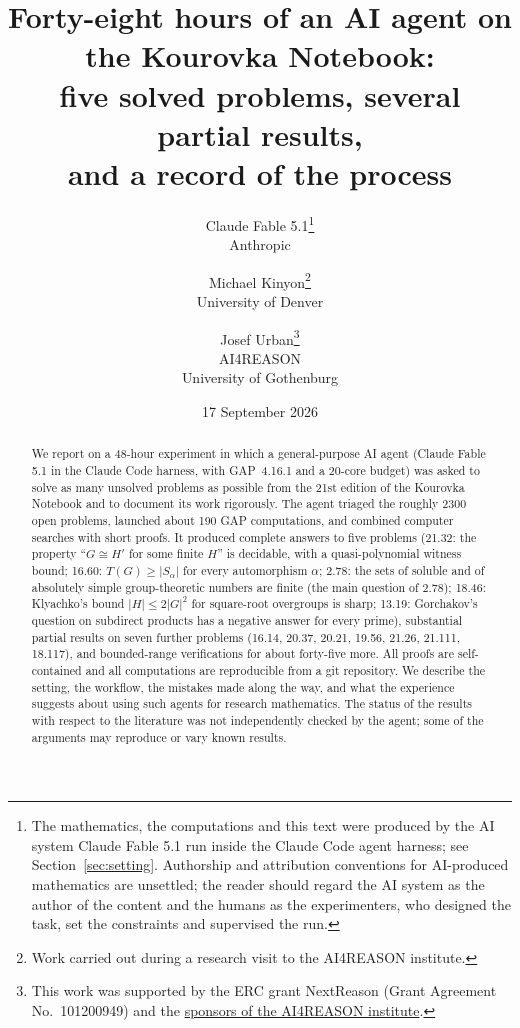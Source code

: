 \documentclass[11pt]{article}
\title{Forty-eight hours of an AI agent on the Kourovka Notebook:\\
five solved problems, several partial results,\\ and a record of the process}
\author{Claude Fable 5.1\thanks{The mathematics, the computations and this text were produced by the
AI system Claude Fable 5.1 run inside the Claude Code agent harness; see Section~\ref{sec:setting}. Authorship and
attribution conventions for AI-produced mathematics are unsettled; the reader should regard the AI system as the
author of the content and the humans as the experimenters, who designed the task, set the constraints and
supervised the run.}\\Anthropic
\and Michael Kinyon\thanks{Work carried out during a research visit to the AI4REASON institute.}\\University of Denver
\and Josef Urban\thanks{This work was supported by the ERC grant NextReason
(Grant Agreement No.\ 101200949) and the
\href{https://ai4reason.eu/sponsors.html}{sponsors of the AI4REASON institute}.}\\AI4REASON\\University of Gothenburg}
\date{17 September 2026}
\theoremstyle{definition}
\begin{document}
\maketitle

\begin{abstract}
We report on a 48-hour experiment in which a general-purpose AI agent (Claude Fable 5.1 in the Claude Code
harness, with GAP~4.16.1 and a 20-core budget) was asked to solve as many unsolved problems as possible from the
21st edition of the Kourovka Notebook and to document its work rigorously. The agent triaged the roughly 2300 open
problems, launched about 190 GAP computations, and combined computer searches with short proofs. It produced
complete answers to five problems (21.32: the property ``$G\cong H'$ for some finite $H$'' is decidable, with a
quasi-polynomial witness bound; 16.60: $T(G)\ge |S_\alpha|$ for every automorphism $\alpha$; 2.78: the sets of
soluble and of absolutely simple group-theoretic numbers are finite (the main question of 2.78); 18.46: Klyachko's bound $|H|\le 2|G|^2$ for
square-root overgroups is sharp; 13.19: Gorchakov's question on subdirect products has a negative answer for
every prime), substantial partial results on seven further problems (16.14, 20.37, 20.21, 19.56, 21.26, 21.111,
18.117), and bounded-range verifications for about forty-five more. All proofs are self-contained and all
computations are reproducible from a git repository. We describe the setting, the workflow, the mistakes made
along the way, and what the experience suggests about using such agents for research mathematics. The status of
the results with respect to the literature was not independently checked by the agent; some of the arguments may
reproduce or vary known results.
\end{abstract}

\tableofcontents












\appendix




\end{document}
